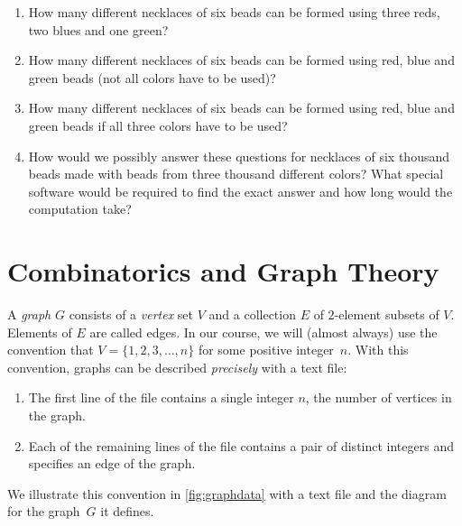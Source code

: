 \begin{enumerate}
\item How many different necklaces of six beads can be formed using three reds, two
blues and one green?
\item How many different necklaces of six beads can be formed using red, blue and green
beads (not all colors have to be used)?
\item How many different necklaces of six beads can be formed using red, blue and green
beads if all three colors have to be used?
\item How would we possibly answer these questions for necklaces of six 
thousand beads made with beads from three thousand different colors?
What special software would be required to find the exact answer and how
long would the computation take?
\end{enumerate}

\section{Combinatorics and Graph Theory}\label{s:intro:graph}

A \textit{graph} $G$ consists of a \textit{vertex} set $V$ and
a collection $E$ of $2$-element subsets of $ V$. Elements of $E$ are
called edges.  In our course, we will (almost always) use the convention
that $V=\{1,2,3,\dots,n\}$ for some positive integer~$n$.  With
this convention, graphs can be described \textit{precisely}
with a text file:
\begin{enumerate}
\item The first line of the file contains a single integer $n$, the
number of vertices in the graph.
\item Each of the remaining lines of the file contains a pair of 
distinct integers and specifies an edge of the graph.
\end{enumerate}
We illustrate this convention in \autoref{fig:graphdata} with a text 
file and the diagram for the graph~$G$ it defines.


